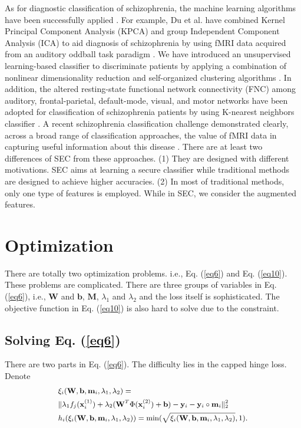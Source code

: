 \documentclass[10pt,journal,compsoc]{IEEEtran}
\begin{document}
As for diagnostic classification of schizophrenia, the machine learning algorithms have been successfully applied \cite{Arbabshirani2013Classification, Du2012High, Shen2009, Watanabe2014Disease}. For example, Du et al. have combined Kernel Principal Component Analysis (KPCA) and group Independent Component Analysis (ICA) to aid diagnosis of schizophrenia by using fMRI data acquired from an auditory oddball task paradigm \cite{Du2012High}. We have introduced an unsupervised learning-based classifier to discriminate patients by applying a combination of nonlinear dimensionality reduction and self-organized clustering algorithms \cite{Shen2009}. In addition, the altered resting-state functional network connectivity (FNC) among auditory, frontal-parietal, default-mode, visual, and motor networks have been adopted for classification of schizophrenia patients by using K-nearest neighbors classifier \cite{Arbabshirani2013Classification}. A recent schizophrenia classification challenge demonstrated clearly, across a broad range of classification approaches, the value of fMRI data in capturing useful information about this disease \cite{Silva2014}. There are at least two differences of SEC from these approaches. (1) They are designed with different motivations. SEC aims at learning a secure classifier while traditional methods are designed to achieve higher accuracies. (2) In most of traditional methods, only one type of features is employed. While in SEC, we consider the augmented features.

\section{Optimization}
\label{sec_optimization}

There are totally two optimization problems. i.e., Eq. (\ref{eq6}) and Eq. (\ref{eq10}). These problems are complicated. There are three groups of variables in Eq. (\ref{eq6}), i.e., $\mathbf{W}$ and $\mathbf{b}$, $\mathbf{M}$, $\lambda_1$ and $\lambda_2$ and the loss itself is sophisticated. The objective function in Eq. (\ref{eq10}) is also hard to solve due to the constraint.

\subsection{Solving Eq. (\ref{eq6})}

There are two parts in Eq. (\ref{eq6}). The difficulty lies in the capped hinge loss. Denote
\begin{equation}
\label{eq15}
\small{
\begin{split}
  &\xi_i(\mathbf{W},\mathbf{b}, \mathbf{m}_i, \lambda_1,\lambda_2) =  \\
  &\| \lambda_1 f_j(\mathbf{x}_i^{(1)})+\lambda_2 (\mathbf{W}^T \Phi(\mathbf{x}_i^{(2)})+\mathbf{b}) - \mathbf{y}_i-\mathbf{y}_i \circ \mathbf{m}_i\|_2^2 \\
  & h_i(\xi_i(\mathbf{W},\mathbf{b}, \mathbf{m}_i, \lambda_1,\lambda_2)) = \min ( \sqrt{\xi_i(\mathbf{W},\mathbf{b}, \mathbf{m}_i, \lambda_1,\lambda_2)}, 1).
\end{split}}
\end{equation}
\end{document}
